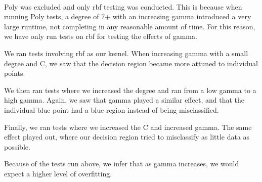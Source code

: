 \documentclass[11pt]{article}
\begin{document}
    \begin{center}
    \end{center}
    { \hspace*{\fill} \\}
    
    Poly was excluded and only rbf testing was conducted. This is because
when running Poly tests, a degree of 7+ with an increasing gamma
introduced a very large runtime, not completing in any reasonable amount
of time. For this reason, we have only run tests on rbf for testing the
effects of gamma.

    We ran tests involving rbf as our kernel. When increasing gamma with a
small degree and C, we saw that the decision region became more attuned
to individual points.

We then ran tests where we increased the degree and ran from a low gamma
to a high gamma. Again, we saw that gamma played a similar effect, and
that the individual blue point had a blue region instead of being
misclassified.

Finally, we ran tests where we increased the C and increased gamma. The
same effect played out, where our decision region tried to misclassify
as little data as possible.

Because of the tests run above, we infer that as gamma increases, we
would expect a higher level of overfitting.


    
    
    
    
\end{document}
